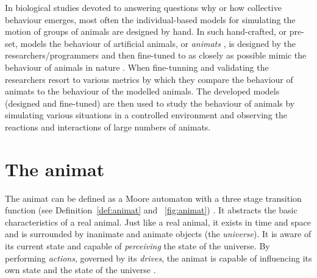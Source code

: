 In biological studies devoted to answering questions why or how collective behaviour emerges, most often the individual-based models for simulating the motion of groups of animals are designed by hand. In such hand-crafted, or pre-set, models the behaviour of artificial animals, or \emph{animats} \cite{cliff1993adding,fine2013unifying,lebarbajec2005fuzzy,watts1998animats,wilson1985knowledge}, is designed by the researchers/programmers and then fine-tuned to as closely as possible mimic the behaviour of animals in nature \cite{couzin2002collective,demsar2014simulated,demsar2015simulating,lebarbajec2005fuzzy,lebarbajec2005simulating,hildenbrandt2010selforganized,vicsek1995novel}. When fine-tunning and validating the researchers resort to various metrics by which they compare the behaviour of animats to the behaviour of the modelled animals. The developed models (designed and fine-tuned) are then used to study the behaviour of animals by simulating various situations in a controlled environment and observing the reactions and interactions of large numbers of animats.

\section{The animat}

The animat can be defined as a Moore automaton \cite{kohavi1978switching} with a three stage transition function (see Definition~\ref{def:animat} and \figurename~\ref{fig:animat}) \cite{lebarbajec2003boids,lebarbajec2003fuzzifying,lebarbajec2005fuzzy,lebarbajec2007boids}. It abstracts the basic characteristics of a real animal. Just like a real animal, it exists in time and space and is surrounded by inanimate and animate objects (\ie the \emph{universe}). It is aware of its current state and capable of \emph{perceiving} the state of the universe. By performing \emph{actions}, governed by its \emph{drives}, the animat is capable of influencing its own state and the state of the universe \cite{lebarbajec2005fuzzy}.

